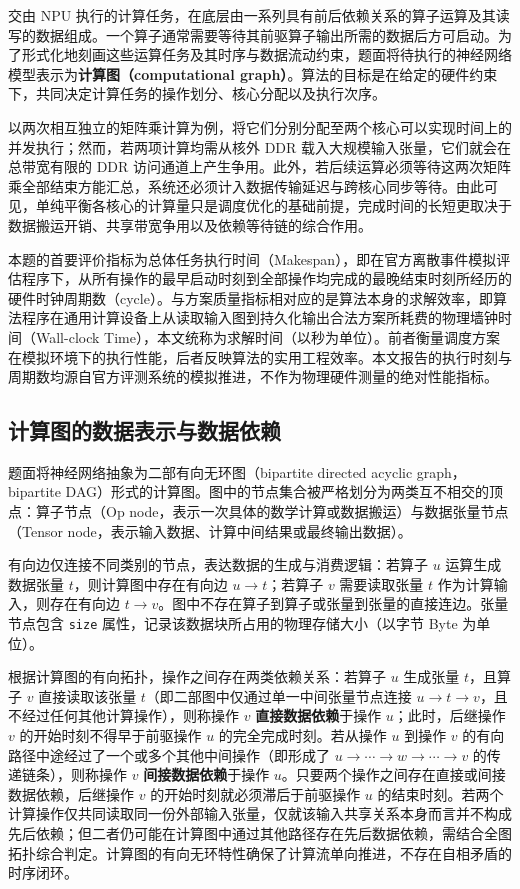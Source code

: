 \documentclass[anonymous,notoc]{gmcm2026}
\begin{document}
交由 NPU 执行的计算任务，在底层由一系列具有前后依赖关系的算子运算及其读写的数据组成。一个算子通常需要等待其前驱算子输出所需的数据后方可启动。为了形式化地刻画这些运算任务及其时序与数据流动约束，题面将待执行的神经网络模型表示为\textbf{计算图（computational graph）}。算法的目标是在给定的硬件约束下，共同决定计算任务的操作划分、核心分配以及执行次序\cite{ref1}。

以两次相互独立的矩阵乘计算为例，将它们分别分配至两个核心可以实现时间上的并发执行；然而，若两项计算均需从核外 DDR 载入大规模输入张量，它们就会在总带宽有限的 DDR 访问通道上产生争用。此外，若后续运算必须等待这两次矩阵乘全部结束方能汇总，系统还必须计入数据传输延迟与跨核心同步等待。由此可见，单纯平衡各核心的计算量只是调度优化的基础前提，完成时间的长短更取决于数据搬运开销、共享带宽争用以及依赖等待链的综合作用。

本题的首要评价指标为总体任务执行时间（Makespan），即在官方离散事件模拟评估程序下，从所有操作的最早启动时刻到全部操作均完成的最晚结束时刻所经历的硬件时钟周期数（cycle）。与方案质量指标相对应的是算法本身的求解效率，即算法程序在通用计算设备上从读取输入图到持久化输出合法方案所耗费的物理墙钟时间（Wall-clock Time），本文统称为求解时间（以秒为单位）。前者衡量调度方案在模拟环境下的执行性能，后者反映算法的实用工程效率。本文报告的执行时刻与周期数均源自官方评测系统的模拟推进，不作为物理硬件测量的绝对性能指标。

\subsection{计算图的数据表示与数据依赖}

题面将神经网络抽象为二部有向无环图（bipartite directed acyclic graph，bipartite DAG）形式的计算图。图中的节点集合被严格划分为两类互不相交的顶点：算子节点（Op node，表示一次具体的数学计算或数据搬运）与数据张量节点（Tensor node，表示输入数据、计算中间结果或最终输出数据）。

有向边仅连接不同类别的节点，表达数据的生成与消费逻辑：若算子 \(u\) 运算生成数据张量 \(t\)，则计算图中存在有向边 \(u \to t\)；若算子 \(v\) 需要读取张量 \(t\) 作为计算输入，则存在有向边 \(t \to v\)。图中不存在算子到算子或张量到张量的直接连边。张量节点包含 \texttt{size} 属性，记录该数据块所占用的物理存储大小（以字节 Byte 为单位）。

根据计算图的有向拓扑，操作之间存在两类依赖关系：若算子 \(u\) 生成张量 \(t\)，且算子 \(v\) 直接读取该张量 \(t\)（即二部图中仅通过单一中间张量节点连接 \(u \to t \to v\)，且不经过任何其他计算操作），则称操作 \(v\) \textbf{直接数据依赖}于操作 \(u\)；此时，后继操作 \(v\) 的开始时刻不得早于前驱操作 \(u\) 的完全完成时刻。若从操作 \(u\) 到操作 \(v\) 的有向路径中途经过了一个或多个其他中间操作（即形成了 \(u \to \cdots \to w \to \cdots \to v\) 的传递链条），则称操作 \(v\) \textbf{间接数据依赖}于操作 \(u\)。只要两个操作之间存在直接或间接数据依赖，后继操作 \(v\) 的开始时刻就必须滞后于前驱操作 \(u\) 的结束时刻。若两个计算操作仅共同读取同一份外部输入张量，仅就该输入共享关系本身而言并不构成先后依赖；但二者仍可能在计算图中通过其他路径存在先后数据依赖，需结合全图拓扑综合判定。计算图的有向无环特性确保了计算流单向推进，不存在自相矛盾的时序闭环。
\end{document}
